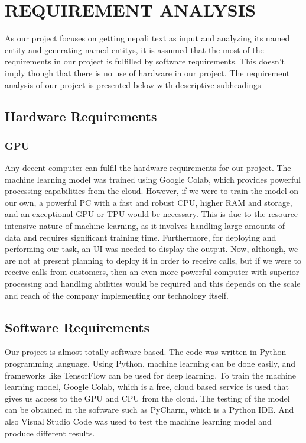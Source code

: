 \chapter{REQUIREMENT ANALYSIS}
\vspace{10pt}

As our project focuses on getting nepali text as input and analyzing its named entity and generating named entitys, it is assumed that the most of the 
requirements in our project is fulfilled by software requirements. This doesn’t imply 
though that there is no use of hardware in our project. The requirement analysis of our 
project is presented below with descriptive subheadings
\section{Hardware Requirements}
\subsection{GPU}
Any decent computer can fulfil the hardware requirements for our project. The machine 
learning model was trained using Google Colab, which provides powerful processing 
capabilities from the cloud. However, if we were to train the model on our own, a 
powerful PC with a fast and robust CPU, higher RAM and storage, and an exceptional 
GPU or TPU would be necessary. This is due to the resource-intensive nature of 
machine learning, as it involves handling large amounts of data and requires significant 
training time. Furthermore, for deploying and performing our task, an UI was needed 
to display the output. Now, although, we are not at present planning to deploy it in order 
to receive calls, but if we were to receive calls from customers, then an even more 
powerful computer with superior processing and handling abilities would be required 
and this depends on the scale and reach of the company implementing our technology 
itself.
\section{Software Requirements}
Our project is almost totally software based. The code was written in Python 
programming language. Using Python, machine learning can be done easily, and 
frameworks like TensorFlow can be used for deep learning. To train the machine 
learning model, Google Colab, which is a free, cloud based service is used that gives 
us access to the GPU and CPU from the cloud. The testing of the model can be obtained 
in the software such as PyCharm, which is a Python IDE. And also Visual Studio Code 
was used to test the machine learning model and produce different results.
